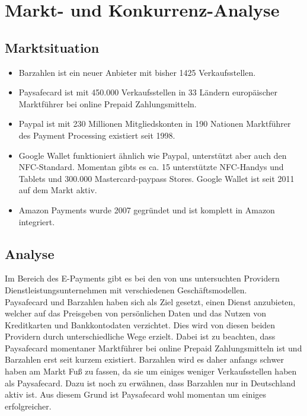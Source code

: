 \section{Markt- und Konkurrenz-Analyse}

\subsection{Marktsituation}
\begin{itemize}
\item Barzahlen ist ein neuer Anbieter mit bisher 1425 Verkaufsstellen.
\item Paysafecard ist mit 450.000 Verkaufsstellen in 33 Ländern europäischer Marktführer bei online Prepaid Zahlungsmitteln.
\item Paypal ist mit 230 Millionen Mitgliedskonten in 190 Nationen Marktführer des Payment Processing existiert seit 1998.
\item Google Wallet funktioniert ähnlich wie Paypal, unterstützt aber auch den NFC-Standard. Momentan gibts es ca. 15 unterstützte NFC-Handys und Tablets und 300.000 Mastercard-paypass Stores. Google Wallet ist seit 2011 auf dem Markt aktiv.
\item Amazon Payments wurde 2007 gegründet und ist komplett in Amazon integriert.
\end{itemize}

\subsection{Analyse}
Im Bereich des E-Payments gibt es bei den von uns untersuchten Providern Dienstleistungsunternehmen mit verschiedenen Geschäftsmodellen.\\

Paysafecard und Barzahlen haben sich als Ziel gesetzt, einen Dienst anzubieten, welcher auf das Preisgeben von persönlichen Daten und das Nutzen von Kreditkarten und Bankkontodaten verzichtet. Dies wird von diesen beiden Providern durch unterschiedliche Wege erzielt. Dabei ist zu beachten, dass Paysafecard momentaner Marktführer bei online Prepaid Zahlungsmitteln ist und Barzahlen erst seit kurzem existiert. Barzahlen wird es daher anfangs schwer haben am Markt Fuß zu fassen, da sie um einiges weniger Verkaufsstellen haben als Paysafecard. Dazu ist noch zu erwähnen, dass Barzahlen nur in Deutschland aktiv ist. Aus diesem Grund ist Paysafecard wohl momentan um einiges erfolgreicher.\\

